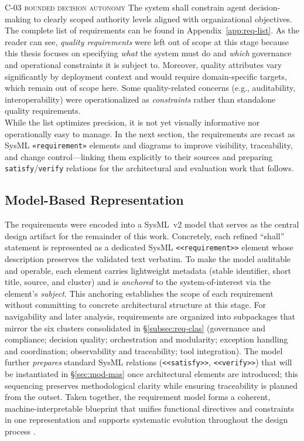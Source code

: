 \noindent \textsc{C-03 bounded decision autonomy} \quad The system shall constrain agent decision-making to clearly scoped authority levels aligned with organizational objectives. \\

The complete list of requirements can be found in Appendix~\ref{app:req-list}. As the reader can see, \emph{quality requirements} were left out of scope at this stage because this thesis focuses on specifying \emph{what} the system must do and \emph{which} governance and operational constraints it is subject to. Moreover, quality attributes vary significantly by deployment context and would require domain-specific targets, which remain out of scope here. Some quality-related concerns (e.g., auditability, interoperability) were operationalized as \emph{constraints} rather than standalone quality requirements. \\

While the list optimizes precision, it is not yet visually informative nor operationally easy to manage. In the next section, the requirements are recast as SysML \texttt{«requirement»} elements and diagrams to improve visibility, traceability, and change control—linking them explicitly to their sources and preparing \texttt{satisfy}/\texttt{verify} relations for the architectural and evaluation work that follows.

\subsection{Model-Based Representation}\label{subsec:req-model}
The requirements were encoded into a SysML~v2 model that serves as the central design artifact for the remainder of this work. Concretely, each refined \enquote{shall} statement is represented as a dedicated SysML \texttt{<<requirement>>} element whose description preserves the validated text verbatim. To make the model auditable and operable, each element carries lightweight metadata (stable identifier, short title, source, and cluster) and is \emph{anchored} to the system-of-interest via the element's \emph{subject}. This anchoring establishes the scope of each requirement without committing to concrete architectural structure at this stage. For navigability and later analysis, requirements are organized into subpackages that mirror the six clusters consolidated in §\ref{subsec:req-clas} (governance and compliance; decision quality; orchestration and modularity; exception handling and coordination; observability and traceability; tool integration). The model further \emph{prepares} standard SysML relations (\texttt{<<satisfy>>}, \texttt{<<verify>>}) that will be instantiated in §\ref{sec:mod-mas} once architectural elements are introduced; this sequencing preserves methodological clarity while ensuring traceability is planned from the outset. Taken together, the requirement model forms a coherent, machine-interpretable blueprint that unifies functional directives and constraints in one representation and supports systematic evolution throughout the design process \parencite{IEEEStandard1990}.

